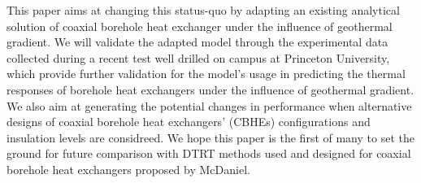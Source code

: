 This paper aims at changing this status-quo by adapting an existing analytical solution of coaxial borehole heat exchanger under the influence of geothermal gradient. We will validate the adapted model through the experimental data collected during a recent test well drilled on campus at Princeton University, which provide further validation for the model's usage in predicting the thermal responses of borehole heat exchangers under the influence of geothermal gradient. %
We also aim at generating the potential changes in performance when alternative designs of coaxial borehole heat exchangers' (CBHEs) configurations and insulation levels are considreed. We hope this paper is the first of many to set the ground for future comparison with DTRT methods used and designed for coaxial borehole heat exchangers proposed by McDaniel. 


